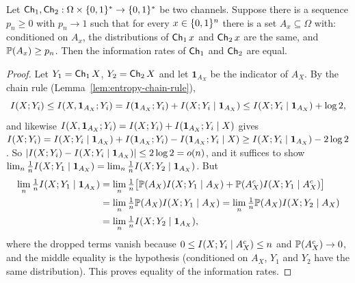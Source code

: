 \begin{lemma}
  \label{lem:info-rate-coupling}
  Let $\mathsf{Ch}_1,\mathsf{Ch}_2:\Omega\times\{0,1\}^*\to\{0,1\}^*$ be two channels. Suppose there
  is a sequence $p_n\ge0$ with $p_n\to1$ such that for every $x\in\{0,1\}^n$ there
  is a set $A_x\subseteq\Omega$ with: conditioned on $A_x$, the distributions of
  $\mathsf{Ch}_1\,x$ and $\mathsf{Ch}_2\,x$ are the same, and $\mathbb{P}(A_x)\ge p_n$. Then the
  information rates of $\mathsf{Ch}_1$ and $\mathsf{Ch}_2$ are equal.
\end{lemma}
\begin{proof}
  Let $Y_1=\mathsf{Ch}_1\,X$, $Y_2=\mathsf{Ch}_2\,X$ and let $\mathbf{1}_{A_X}$ be the indicator
  of $A_X$. By the chain rule (Lemma~\ref{lem:entropy-chain-rule}),
  \[
    I(X;Y_i)\le I(X,\mathbf{1}_{A_X};Y_i)
      = I(\mathbf{1}_{A_X};Y_i)+I(X;Y_i\mid\mathbf{1}_{A_X})
      \le I(X;Y_i\mid\mathbf{1}_{A_X})+\log 2,
  \]
  and likewise $I(X,\mathbf{1}_{A_X};Y_i)=I(X;Y_i)+I(\mathbf{1}_{A_X};Y_i\mid X)$
  gives $I(X;Y_i)=I(X;Y_i\mid\mathbf{1}_{A_X})+I(\mathbf{1}_{A_X};Y_i)
   -I(\mathbf{1}_{A_X};Y_i\mid X)\ge I(X;Y_i\mid\mathbf{1}_{A_X})-2\log 2$. So
  $|I(X;Y_i)-I(X;Y_i\mid\mathbf{1}_{A_X})|\le 2\log 2=o(n)$, and it suffices to
  show $\lim_n\tfrac1n I(X;Y_1\mid\mathbf{1}_{A_X})=\lim_n\tfrac1n
  I(X;Y_2\mid\mathbf{1}_{A_X})$. But
  \begin{align*}
    \lim_{n}\tfrac1n I(X;Y_1\mid\mathbf{1}_{A_X})
      &= \lim_n\tfrac1n\big[\mathbb{P}(A_X)I(X;Y_1\mid A_X)
          +\mathbb{P}(A_X^c)I(X;Y_1\mid A_X^c)\big]\\
      &= \lim_n\tfrac1n\mathbb{P}(A_X)I(X;Y_1\mid A_X)
       = \lim_n\tfrac1n\mathbb{P}(A_X)I(X;Y_2\mid A_X)\\
      &= \lim_n\tfrac1n I(X;Y_2\mid\mathbf{1}_{A_X}),
  \end{align*}
  where the dropped terms vanish because $0\le I(X;Y_i\mid A_X^c)\le n$ and
  $\mathbb{P}(A_X^c)\to0$, and the middle equality is the hypothesis (conditioned on
  $A_X$, $Y_1$ and $Y_2$ have the same distribution). This proves equality of the
  information rates.
\end{proof}


